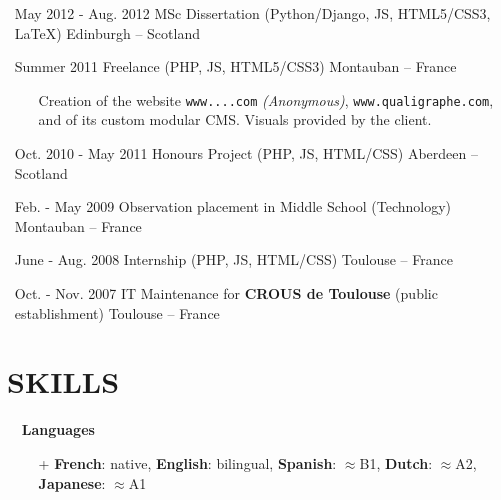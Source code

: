\documentclass{res}
\begin{document}
\begin{resume}
\begin{itemize}
\begin{itemize}
\begin{itemize}
                        \end{itemize}
                \end{itemize}
                \item[] May 2012 - Aug. 2012 \tabto{5cm} MSc Dissertation (Python/Django, JS, HTML5/CSS3, \LaTeX{}) \hfill Edinburgh -- Scotland
                \item[] Summer 2011 \tabto{5cm} Freelance (PHP, JS, HTML5/CSS3) \hfill Montauban -- France
                \begin{itemize}
                        \item[] Creation of the website \ifisanon \texttt{www....com} \textit{(Anonymous)}, \else \texttt{www.qualigraphe.com}, \fi and of its custom modular CMS. Visuals provided by the client.
                \end{itemize}
                \item[] Oct. 2010 - May 2011 \tabto{5cm} Honours Project (PHP, JS, HTML/CSS) \hfill Aberdeen -- Scotland
                \item[] Feb. - May 2009 \tabto{5cm} Observation placement in Middle School (Technology) \hfill Montauban -- France
                \item[] June - Aug. 2008 \tabto{5cm} Internship (PHP, JS, HTML/CSS) \hfill Toulouse -- France
                \item[] Oct. - Nov. 2007 \tabto{5cm} IT Maintenance for \textbf{CROUS de Toulouse} (public establishment) \hfill Toulouse -- France
        \end{itemize}

 \pagebreak

\section{\faLayerGroup~SKILLS}
        \begin{itemize}
                \item[] \faLanguage~\textbf{Languages}
                \begin{itemize}
                 \item[+]  \textbf{French}: native, \textbf{English}: bilingual, \textbf{Spanish}: $\approx$B1, \textbf{Dutch}: $\approx$A2, \textbf{Japanese}: $\approx$A1
                \end{itemize}
        \end{itemize}


\end{resume}
\end{document}
